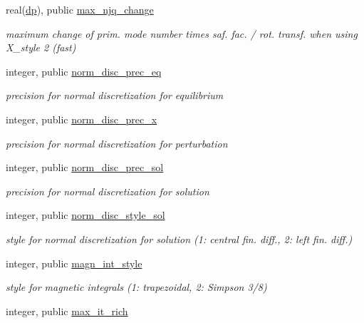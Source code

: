 \begin{DoxyCompactItemize}
real(\hyperlink{namespacenum__vars_a03802aa2bd86439d7a9370836fabf3f2}{dp}), public \hyperlink{namespacenum__vars_a2f7c3870fc9449cf70e4bf44612a8b9a}{max\+\_\+njq\+\_\+change}
\begin{DoxyCompactList}\small\item\em maximum change of prim. mode number times saf. fac. / rot. transf. when using X\+\_\+style 2 (fast) \end{DoxyCompactList}\item 
integer, public \hyperlink{namespacenum__vars_a9554337420be2ea367f2a6bc71bb654f}{norm\+\_\+disc\+\_\+prec\+\_\+eq}
\begin{DoxyCompactList}\small\item\em precision for normal discretization for equilibrium \end{DoxyCompactList}\item 
integer, public \hyperlink{namespacenum__vars_acba4a05e477f116855028f2057ce4e49}{norm\+\_\+disc\+\_\+prec\+\_\+x}
\begin{DoxyCompactList}\small\item\em precision for normal discretization for perturbation \end{DoxyCompactList}\item 
integer, public \hyperlink{namespacenum__vars_a125bbc64ad3fac6752bc64e4222c6f50}{norm\+\_\+disc\+\_\+prec\+\_\+sol}
\begin{DoxyCompactList}\small\item\em precision for normal discretization for solution \end{DoxyCompactList}\item 
integer, public \hyperlink{namespacenum__vars_a5afcab5bc4c55fdb6a816bf7261160e2}{norm\+\_\+disc\+\_\+style\+\_\+sol}
\begin{DoxyCompactList}\small\item\em style for normal discretization for solution (1\+: central fin. diff., 2\+: left fin. diff.) \end{DoxyCompactList}\item 
integer, public \hyperlink{namespacenum__vars_af0177cf335f43b5d27d9a016770c8f7a}{magn\+\_\+int\+\_\+style}
\begin{DoxyCompactList}\small\item\em style for magnetic integrals (1\+: trapezoidal, 2\+: Simpson 3/8) \end{DoxyCompactList}\item 
integer, public \hyperlink{namespacenum__vars_afbd4cb9a4ef9e8a277aecfc41b09aa1d}{max\+\_\+it\+\_\+rich}

\end{DoxyCompactItemize}
